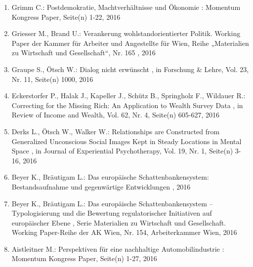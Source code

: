 \begin{enumerate}[leftmargin=*, labelsep=0.5cm]
	 \item Grimm C.:  Postdemokratie, Machtverhältnisse und Ökonomie  : Momentum Kongress Paper, Seite(n) 1-22, 2016
	 \item Griesser M., Brand U.:  Verankerung wohlstandorientierter Politik. Working Paper der Kammer für Arbeiter und Angestellte für Wien, Reihe „Materialien zu Wirtschaft und Gesellschaft“, Nr. 165  , 2016
	 \item Graupe S., Ötsch W.:  Dialog nicht erwünscht  , in Forschung & Lehre, Vol. 23, Nr. 11, Seite(n) 1000, 2016
	 \item Eckerstorfer P., Halak J., Kapeller J., Schütz B., Springholz F., Wildauer R.:  Correcting for the Missing Rich: An Application to Wealth Survey Data  , in Review of Income and Wealth, Vol. 62, Nr. 4, Seite(n) 605-627, 2016
	 \item Derks L., Ötsch W., Walker W.:  Relationships are Constructed from Generalized Unconscious Social Images Kept in Steady Locations in Mental Space  , in Journal of Experiential Psychotherapy, Vol. 19, Nr. 1, Seite(n) 3-16, 2016
	 \item Beyer K., Bräutigam L.:  Das europäische Schattenbankensystem: Bestandsaufnahme und gegenwärtige Entwicklungen  , 2016
	 \item Beyer K., Bräutigam L.:  Das europäische Schattenbankensystem – Typologisierung und die Bewertung regulatorischer Initiativen auf europäischer Ebene  , Serie Materialien zu Wirtschaft und Gesellschaft. Working Paper-Reihe der AK Wien, Nr. 154, Arbeiterkammer Wien, 2016
	 \item Aistleitner M.:  Perspektiven für eine nachhaltige Automobilindustrie  : Momentum Kongress Paper, Seite(n) 1-27, 2016
\end{enumerate} 
